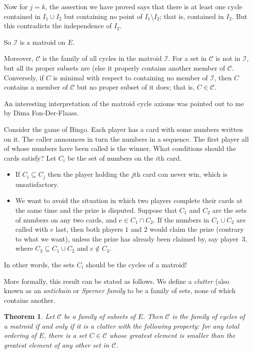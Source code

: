 \documentclass[12pt]{article}
\newtheorem{theorem}{Theorem}[section]
\begin{document}
Now for $j=k$, the assertion we have proved says that there is at
least one cycle contained in $I_1\cup I_2$ but containing no
point of $I_1\setminus I_2$; that is, contained in $I_2$. But this
contradicts the independence of $I_2$. 

So $\mathcal{I}$ is a matroid on $E$.

Moreover, $\mathcal{C}$ is the family of all cycles in the
matroid $\mathcal{I}$. For a set in $\mathcal{C}$ is not in
$\mathcal{I}$, but all its proper subsets are (else it properly
contains another member of $\mathcal{C}$. Conversely, if $C$ is
minimal with respect to containing no member of $\mathcal{I}$,
then $C$ contains a member of $\mathcal{C}$ but no proper subset
of it does; that is, $C\in\mathcal{C}$.

\medbreak

An interesting interpretation of the matroid cycle axioms was
pointed out to me by Dima Fon-Der-Flaass.

Consider the game of Bingo. Each player has a card with some
numbers written on it. The caller announces in turn the numbers
in a sequence. The first player all of whose numbers have been
called is the winner. What conditions should the cards satisfy?
Let $C_i$ be the set of numbers on the $i$th card.
\begin{itemize}
\item If $C_i\subseteq C_j$ then the player holding the $j$th card
can never win, which is unsatisfactory.
\item We want to avoid the situation in which two players complete
their cards at the same time and the prize is disputed. Suppose
that $C_1$ and $C_2$ are the sets of numbers on any two cards,
and $e\in C_1\cap C_2$. If the numbers in $C_1\cup C_2$ are
called with $e$ last, then both players $1$ and $2$ would claim
the prize (contrary to what we want), unless the prize has
already been claimed by, say player~$3$, where $C_3\subseteq
C_1\cup C_2$ and $e\notin C_3$.
\end{itemize}
In other words, the sets $C_i$ should be the cycles of a matroid!

More formally, this result can be stated as follows. We define a
\emph{clutter} (also known as an \emph{antichain} or
\emph{Sperner family} to be a family of sets, none of which
contains another.

\begin{theorem}
Let $\mathcal{C}$ be a family of subsets of $E$. Then $\mathcal{C}$ 
is the family of cycles of a matroid if and only if it is a clutter
with the following property:
for any total ordering of $E$, there is a set $C\in\mathcal{C}$
whose greatest element is smaller than the greatest element of
any other set in $\mathcal{C}$.
\label{bingo}
\end{theorem}
\end{document}
